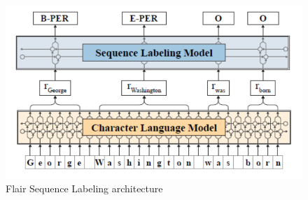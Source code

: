 \begin{figure}[!h]
    \centering
    \includegraphics[scale=.5]{imagenes/2_theorical_framework/information_extraction/sequenceLabelingModel.PNG}
    \caption{Flair Sequence Labeling architecture~\cite{seqlab:flair-AkbikBBRSV19}}
    \label{fig:flairArchitecture}
\end{figure}